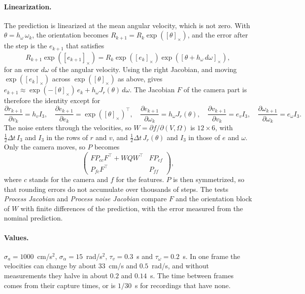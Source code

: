 \documentclass[11pt]{article}
\newcommand{\dt}{\Delta t}
\begin{document}
\paragraph{Linearization.}
The prediction is linearized at the mean angular velocity, which is not zero. With
$\theta = h_\omega\, \omega_k$, the orientation becomes $R_{k+1} = R_k \exp([\theta]_\times)$, and
the error after the step is the $e_{k+1}$ that satisfies
\begin{equation}
  R_{k+1} \exp([e_{k+1}]_\times) = R_k \exp([e_k]_\times) \exp([\theta + h_\omega\, d\omega]_\times),
\end{equation}
for an error $d\omega$ of the angular velocity. Using the right Jacobian, and moving
$\exp([e_k]_\times)$ across $\exp([\theta]_\times)$ as above, gives
$e_{k+1} \approx \exp(-[\theta]_\times)\, e_k + h_\omega J_r(\theta)\, d\omega$. The Jacobian $F$
of the camera part is therefore the identity except for
\begin{equation}
  \frac{\partial r_{k+1}}{\partial v_k} = h_v I_3,
  \quad
  \frac{\partial e_{k+1}}{\partial e_k} = \exp([\theta]_\times)^\top,
  \quad
  \frac{\partial e_{k+1}}{\partial \omega_k} = h_\omega J_r(\theta),
  \quad
  \frac{\partial v_{k+1}}{\partial v_k} = e_v I_3,
  \quad
  \frac{\partial \omega_{k+1}}{\partial \omega_k} = e_\omega I_3.
\end{equation}
The noise enters through the velocities, so $W = \partial f / \partial (V, \Omega)$ is
$12 \times 6$, with $\frac{1}{2} \dt\, I_3$ and $I_3$ in the rows of $r$ and $v$, and
$\frac{1}{2} \dt\, J_r(\theta)$ and $I_3$ in those of $e$ and $\omega$. Only the camera moves, so
$P$ becomes
\begin{equation}
  \begin{pmatrix} F P_{cc} F^\top + W Q W^\top & F P_{cf} \\ P_{fc} F^\top & P_{ff} \end{pmatrix},
\end{equation}
where $c$ stands for the camera and $f$ for the features. $P$ is then symmetrized, so that rounding
errors do not accumulate over thousands of steps. The tests \emph{Process Jacobian} and
\emph{Process noise Jacobian} compare $F$ and the orientation block of $W$ with finite differences
of the prediction, with the error measured from the nominal prediction.

\paragraph{Values.}
$\sigma_a = 1000$~cm/s$^2$, $\sigma_\alpha = 15$~rad/s$^2$, $\tau_v = 0.3$~s and
$\tau_\omega = 0.2$~s. In one frame the velocities can change by about $33$~cm/s and $0.5$~rad/s,
and without measurements they halve in about $0.2$ and $0.14$~s. The time between frames comes from
their capture times, or is $1/30$~s for recordings that have none.
\end{document}
